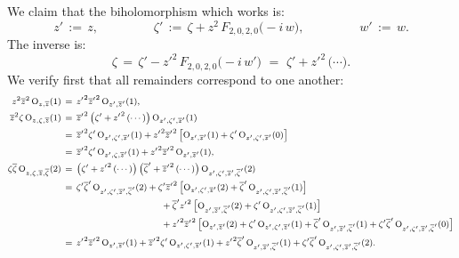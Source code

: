 \documentclass[12pt,twoside,leqno,openany]{amsart}
\begin{document}
We claim that the biholomorphism which works is:
\[
z'
\,:=\,
z,
\ \ \ \ \ \ \ \ \ \ \ \ \ \ \ \ \ \ \ \
\zeta'
\,:=\,
\zeta
+
z^2\,
F_{2,0,2,0}\big(-i\,w\big),
\ \ \ \ \ \ \ \ \ \ \ \ \ \ \ \ \ \ \ \
w'
\,:=\,
w.
\]
The inverse is:
\[
\zeta
\,=\,
\zeta'
-
{z'}^2\,
F_{2,0,2,0}\big(-i\,w'\big)
\,\,=\,\,
\zeta'
+
{z'}^2\,\big(\cdots\big).
\]
We verify first that all remainders correspond to one another:
\[
\footnotesize
\aligned
z^2\overline{z}^2\,
{\rm O}_{z,\overline{z}}(1)
&
\,=\,
{z'}^2{\overline{z}'}^2\,
{\rm O}_{z',\overline{z}'}(1),
\\
\overline{z}^2\zeta\,
{\rm O}_{z,\zeta,\overline{z}}(1)
&
\,=\,
{\overline{z}'}^2\,
\big(
\zeta'
+
{z'}^2\,(\cdots)
\big)\,
{\rm O}_{z',\zeta',\overline{z}'}(1)
\\
&
\,=\,
{\overline{z}'}^2\zeta'\,
{\rm O}_{z',\zeta',\overline{z}'}(1)
+
{z'}^2{\overline{z}'}^2\,
\big[
{\rm O}_{z',\overline{z}'}(1)
+
\zeta'\,
{\rm O}_{z',\zeta',\overline{z}'}(0)
\big]
\\
&
\,=\,
{\overline{z}'}^2\zeta'\,
{\rm O}_{z',\zeta,\overline{z}'}(1)
+
{z'}^2{\overline{z}'}^2\,
{\rm O}_{z',\overline{z}'}(1),
\\
\zeta\overline{\zeta}\,
{\rm O}_{z,\zeta,\overline{z},\overline{\zeta}}(2)
&
\,=\,
\big(
\zeta'
+
{z'}^2\,(\cdots)
\big)\,
\big(
\overline{\zeta}'
+
{\overline{z}'}^2\,(\cdots)
\big)\,
{\rm O}_{z',\zeta',\overline{z}',\overline{\zeta}'}(2)
\\
&
\,=\,
\zeta'\overline{\zeta}'\,
{\rm O}_{z',\zeta',\overline{z}',\overline{\zeta}'}(2)
+
\zeta'{\overline{z}'}^2\,
\big[
{\rm O}_{z',\zeta',\overline{z}'}(2)
+
\overline{\zeta}'\,
{\rm O}_{z',\zeta',\overline{z}',\overline{\zeta}'}(1)
\big]
\\
&
\ \ \ \ \ \ \ \ \ \ \ \ \ \ \ \ \ \ \ \ \ \ \ \ \ \ \ \ \ \ \ \ \ 
+
\overline{\zeta}'{z'}^2\,
\big[
{\rm O}_{z',\overline{z}',\overline{\zeta}'}(2)
+
\zeta'\,{\rm O}_{z',\zeta',\overline{z}',\overline{\zeta}'}(1)
\big]
\\
&
\ \ \ \ \ \ \ \ \ \ \ \ \ \ \ \ \ \ \ \ \ \ \ \ \ \ \ \ \ \ \ \ \ 
+
{z'}^2{\overline{z}'}^2\,
\big[
{\rm O}_{z',\overline{z}'}(2)
+
\zeta'\,{\rm O}_{z',\zeta',\overline{z}'}(1)
+
\overline{\zeta}'\,
{\rm O}_{z',\overline{z}',\overline{\zeta}'}(1)
+
\zeta'\overline{\zeta}'\,
{\rm O}_{z',\zeta',\overline{z}',\overline{\zeta}'}(0)
\big]
\\
&
\,=\,
{z'}^2{\overline{z}'}^2\,
{\rm O}_{z',\overline{z}'}(1)
+
{\overline{z}'}^2\zeta'\,
{\rm O}_{z',\zeta',\overline{z}'}(1)
+
{z'}^2\overline{\zeta}'\,
{\rm O}_{z',\overline{z}',\overline{\zeta}'}(1)
+
\zeta'{\overline{\zeta}'}\,
{\rm O}_{z',\zeta',\overline{z}',\overline{\zeta}'}(2).
\endaligned
\]
\end{document}
